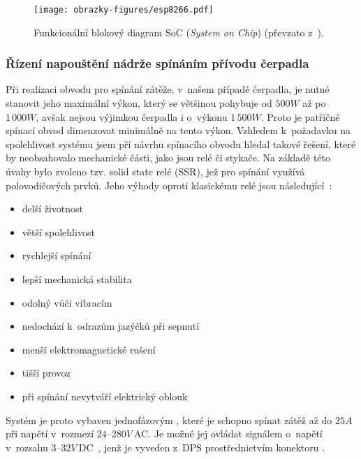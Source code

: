             \begin{figure}[h]
                \centering
                \texttt{[image: obrazky-figures/esp8266.pdf]}
                \caption{Funkcionální blokový diagram SoC (\textit{System on Chip})  (převzato z~\cite{io:esp8266}).}
                \label{img:esp8266}
            \end{figure}

        \subsubsection{Řízení napouštění nádrže spínáním přívodu čerpadla}
            Při realizaci obvodu pro spínání zátěže, v~našem případě čerpadla, je nutné stanovit jeho maximální výkon, který se většinou pohybuje od $500\unit{W}$ až po $1\,000\unit{W}$, avšak nejsou výjimkou čerpadla i o~výkonu $1\,500\unit{W}$. Proto je patřičné spínací obvod dimenzovat minimálně na tento výkon. Vzhledem k~požadavku na spolehlivost systému jsem při návrhu spínacího obvodu hledal takové řešení, které by neobsahovalo mechanické části, jako jsou relé či stykače. Na základě této úvahy bylo zvoleno tzv. solid state relé (SSR), jež pro spínání využívá polovodičových prvků. Jeho výhody oproti klasickému relé jsou následující~\cite{book:embedded_1}:
            
            \begin{itemize}
                \item delší životnost
                \item větší spolehlivost
                \item rychlejší spínání
                \item lepší mechanická stabilita
                \item odolný vůči vibracím
                \item nedochází k~odrazům jazýčků při sepnutí
                \item menší elektromagnetické rušení
                \item tišší provoz
                \item při spínání nevytváří elektrický oblouk
            \end{itemize}

            Systém je proto vybaven jednofázovým , které je schopno spínat zátěž až do $25\unit{A}$ při napětí v~rozmezí $24$--$280\unit{V}\ $AC. Je možné jej ovládat signálem o~napětí v~rozsahu $3$--$32\unit{V}\ $DC~\cite{io:ssr}, jenž je vyveden z~DPS prostřednictvím konektoru . 

